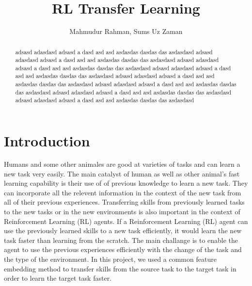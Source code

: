 \documentclass[letterpaper, 11 pt, conference]{ieeeconf}  %
\title{\LARGE \bf
RL Transfer Learning
}
\author{Mahmudur Rahman, Sums Uz Zaman}
\begin{document}
\maketitle
\thispagestyle{empty}
\pagestyle{empty}


\begin{abstract}

adsasd adasdasd  adsasd a dasd asd asd asdasdas dasdas das asdasdasd adsasd adasdasd  adsasd a dasd asd asd asdasdas dasdas das asdasdasd adsasd adasdasd  adsasd a dasd asd asd asdasdas dasdas das asdasdasd adsasd adasdasd  adsasd a dasd asd asd asdasdas dasdas das asdasdasd adsasd adasdasd  adsasd a dasd asd asd asdasdas dasdas das asdasdasd adsasd adasdasd  adsasd a dasd asd asd asdasdas dasdas das asdasdasd adsasd adasdasd  adsasd a dasd asd asd asdasdas dasdas das asdasdasd adsasd adasdasd  adsasd a dasd asd asd asdasdas dasdas das asdasdasd

\end{abstract}


\section{Introduction}

Humans and some other animales are good at varieties of tasks and can learn a new task very easily. The main catalyst of human as well as other animal's fast learning capability is  their use of of previous knowledge to learn a new task. They can incorporate all the relevent information in the context of the new task from all of their previous experiences. Transferring skills from previously learned tasks to the new tasks or in the new environments is also important in the context of Reinforcement Learning (RL) agents. If a Reinforcement Learning (RL) agent can use the previously learned skills to a new task efficiently, it would learn the new task faster than learning from the scratch. The main challange is to enable the agent to use the previous experiences efficiently with the change of the task and the type of the environment. In this project, we used a common feature embedding method to transfer skills from the source task to the target task in order to learn the target task faster.


%
\end{document}
